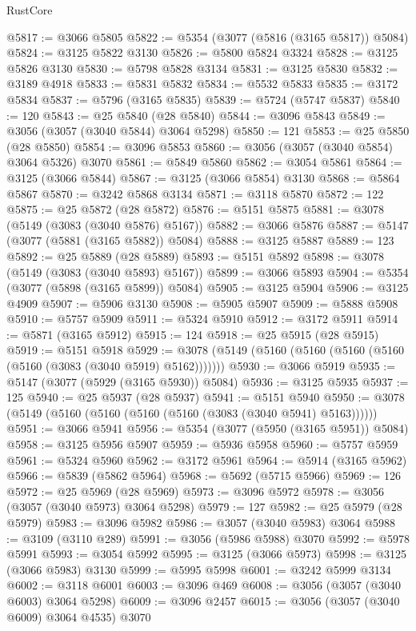 \begin{lexlean}{RustCore}
\begin{coremodule}
@5817 := @3066 @5805
@5822 := @5354 (@3077 (@5816 (@3165 @5817)) @5084)
@5824 := @3125 @5822 @3130
@5826 := @5800 @5824 @3324
@5828 := @3125 @5826 @3130
@5830 := @5798 @5828 @3134
@5831 := @3125 @5830
@5832 := @3189 @4918
@5833 := @5831 @5832
@5834 := @5532 @5833
@5835 := @3172 @5834
@5837 := @5796 (@3165 @5835)
@5839 := @5724 (@5747 @5837)
@5840 := 120
@5843 := @25 @5840 (@28 @5840)
@5844 := @3096 @5843
@5849 := @3056 (@3057 (@3040 @5844) @3064 @5298)
@5850 := 121
@5853 := @25 @5850 (@28 @5850)
@5854 := @3096 @5853
@5860 := @3056 (@3057 (@3040 @5854) @3064 @5326) @3070
@5861 := @5849 @5860
@5862 := @3054 @5861
@5864 := @3125 (@3066 @5844)
@5867 := @3125 (@3066 @5854) @3130
@5868 := @5864 @5867
@5870 := @3242 @5868 @3134
@5871 := @3118 @5870
@5872 := 122
@5875 := @25 @5872 (@28 @5872)
@5876 := @5151 @5875
@5881 := @3078 (@5149 (@3083 (@3040 @5876) @5167))
@5882 := @3066 @5876
@5887 := @5147 (@3077 (@5881 (@3165 @5882)) @5084)
@5888 := @3125 @5887
@5889 := 123
@5892 := @25 @5889 (@28 @5889)
@5893 := @5151 @5892
@5898 := @3078 (@5149 (@3083 (@3040 @5893) @5167))
@5899 := @3066 @5893
@5904 := @5354 (@3077 (@5898 (@3165 @5899)) @5084)
@5905 := @3125 @5904
@5906 := @3125 @4909
@5907 := @5906 @3130
@5908 := @5905 @5907
@5909 := @5888 @5908
@5910 := @5757 @5909
@5911 := @5324 @5910
@5912 := @3172 @5911
@5914 := @5871 (@3165 @5912)
@5915 := 124
@5918 := @25 @5915 (@28 @5915)
@5919 := @5151 @5918
@5929 := @3078 (@5149 (@5160 (@5160 (@5160 (@5160 (@5160 (@3083 (@3040 @5919) @5162)))))))
@5930 := @3066 @5919
@5935 := @5147 (@3077 (@5929 (@3165 @5930)) @5084)
@5936 := @3125 @5935
@5937 := 125
@5940 := @25 @5937 (@28 @5937)
@5941 := @5151 @5940
@5950 := @3078 (@5149 (@5160 (@5160 (@5160 (@5160 (@3083 (@3040 @5941) @5163))))))
@5951 := @3066 @5941
@5956 := @5354 (@3077 (@5950 (@3165 @5951)) @5084)
@5958 := @3125 @5956 @5907
@5959 := @5936 @5958
@5960 := @5757 @5959
@5961 := @5324 @5960
@5962 := @3172 @5961
@5964 := @5914 (@3165 @5962)
@5966 := @5839 (@5862 @5964)
@5968 := @5692 (@5715 @5966)
@5969 := 126
@5972 := @25 @5969 (@28 @5969)
@5973 := @3096 @5972
@5978 := @3056 (@3057 (@3040 @5973) @3064 @5298)
@5979 := 127
@5982 := @25 @5979 (@28 @5979)
@5983 := @3096 @5982
@5986 := @3057 (@3040 @5983) @3064
@5988 := @3109 (@3110 @289)
@5991 := @3056 (@5986 @5988) @3070
@5992 := @5978 @5991
@5993 := @3054 @5992
@5995 := @3125 (@3066 @5973)
@5998 := @3125 (@3066 @5983) @3130
@5999 := @5995 @5998
@6001 := @3242 @5999 @3134
@6002 := @3118 @6001
@6003 := @3096 @469
@6008 := @3056 (@3057 (@3040 @6003) @3064 @5298)
@6009 := @3096 @2457
@6015 := @3056 (@3057 (@3040 @6009) @3064 @4535) @3070

\end{coremodule}
\end{lexlean}
